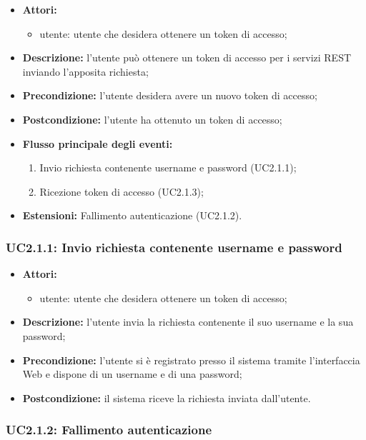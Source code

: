 \begin{itemize}
	\item \textbf{Attori:}
	\begin{itemize}
		\item utente: utente che desidera ottenere un token di accesso;
	\end{itemize}
	\item \textbf{Descrizione:} l'utente può ottenere un token di accesso per i servizi REST inviando l'apposita richiesta;
	\item \textbf{Precondizione:} l'utente desidera avere un nuovo token di accesso;
	\item \textbf{Postcondizione:} l'utente ha ottenuto un token di accesso;
	\item \textbf{Flusso principale degli eventi:}
	\begin{enumerate}
		\item Invio richiesta contenente username e password (UC2.1.1);
		\item Ricezione token di accesso (UC2.1.3);
	\end{enumerate}
	\item \textbf{Estensioni:} Fallimento autenticazione (UC2.1.2).
\end{itemize}


\subsubsection{UC2.1.1: Invio richiesta contenente username e password}

\begin{itemize}
	\item \textbf{Attori:}
	\begin{itemize}
		\item utente: utente che desidera ottenere un token di accesso;
	\end{itemize}
	\item \textbf{Descrizione:} l'utente invia la richiesta contenente il suo username e la sua password;
	\item \textbf{Precondizione:} l'utente si è registrato presso il sistema tramite l'interfaccia Web e dispone di un username e di una password;
	\item \textbf{Postcondizione:} il sistema riceve la richiesta inviata dall'utente.
\end{itemize}

\subsubsection{UC2.1.2: Fallimento autenticazione}

